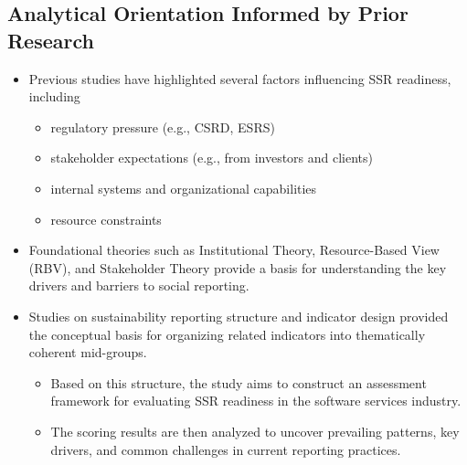 \subsection{Analytical Orientation Informed by Prior Research}
\begin{itemize}
    \item Previous studies have highlighted several factors influencing SSR readiness, including 
        \begin{itemize}
        \item regulatory pressure (e.g., CSRD, ESRS)
        \item stakeholder expectations (e.g., from investors and clients)
        \item internal systems and organizational capabilities \parencite{Christensen2021}
        \item resource constraints
        \end{itemize}
    \item Foundational theories such as Institutional Theory, Resource-Based View (RBV), and Stakeholder Theory provide a basis for understanding the key drivers and barriers to social reporting.
    \item Studies on sustainability reporting structure and indicator design provided 
    the conceptual basis for organizing related indicators into thematically coherent mid-groups.
        \begin{itemize}
        \item Based on this structure, the study aims to construct an assessment framework 
        for evaluating SSR readiness in the software services industry.
        \item The scoring results are then analyzed to uncover prevailing patterns, key drivers, 
        and common challenges in current reporting practices.
        \end{itemize}
\end{itemize}
